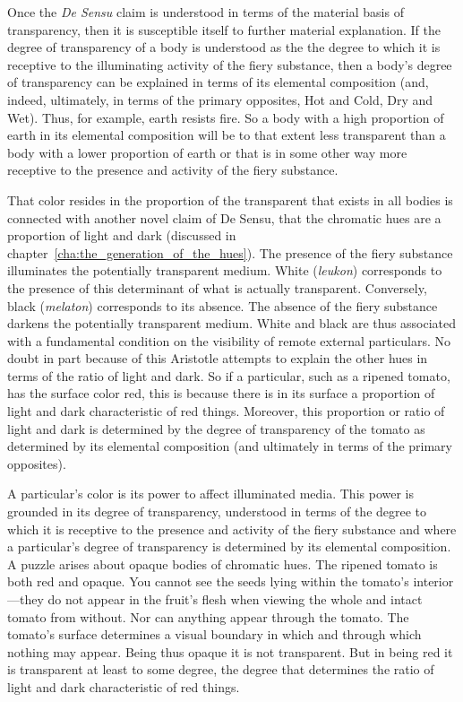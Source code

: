 Once the \emph{De Sensu} claim is understood in terms of the material basis of transparency, then it is susceptible itself to further material explanation. If the degree of transparency of a body is understood as the the degree to which it is receptive to the illuminating activity of the fiery substance, then a body's degree of transparency can be explained in terms of its elemental composition (and, indeed, ultimately, in terms of the primary opposites, Hot and Cold, Dry and Wet). Thus, for example, earth resists fire. So a body with a high proportion of earth in its elemental composition will be to that extent less transparent than a body with a lower proportion of earth or that is in some other way more receptive to the presence and activity of the fiery substance.

That color resides in the proportion of the transparent that exists in all bodies is connected with another novel claim of De Sensu, that the chromatic hues are a proportion of light and dark (discussed in chapter~\ref{cha:the_generation_of_the_hues}). The presence of the fiery substance illuminates the potentially transparent me\-di\-um. White (\emph{leukon}) corresponds to the presence of this determinant of what is actually transparent. Conversely, black (\emph{melaton}) corresponds to its absence. The absence of the fiery substance darkens the potentially transparent medium. White and black are thus associated with a fundamental condition on the visibility of remote external particulars. No doubt in part because of this Aristotle attempts to explain the other hues in terms of the ratio of light and dark. So if a particular, such as a ripened tomato, has the surface color red, this is because there is in its surface a proportion of light and dark characteristic of red things. Moreover, this proportion or ratio of light and dark is determined by the degree of transparency of the tomato as determined by its elemental composition (and ultimately in terms of the primary opposites).

A particular's color is its power to affect illuminated media. This power is grounded in its degree of transparency, understood in terms of the degree to which it is receptive to the presence and activity of the fiery substance and where a particular's degree of transparency is determined by its elemental composition. A puzzle arises about opaque bodies of chromatic hues. The ripened tomato is both red and opaque. You cannot see the seeds lying within the tomato's interior---they do not appear in the fruit's flesh when viewing the whole and intact tomato from without. Nor can anything appear through the tomato. The tomato's surface determines a visual boundary in which and through which nothing may appear. Being thus opaque it is not transparent. But in being red it is transparent at least to some degree, the degree that determines the ratio of light and dark characteristic of red things.

